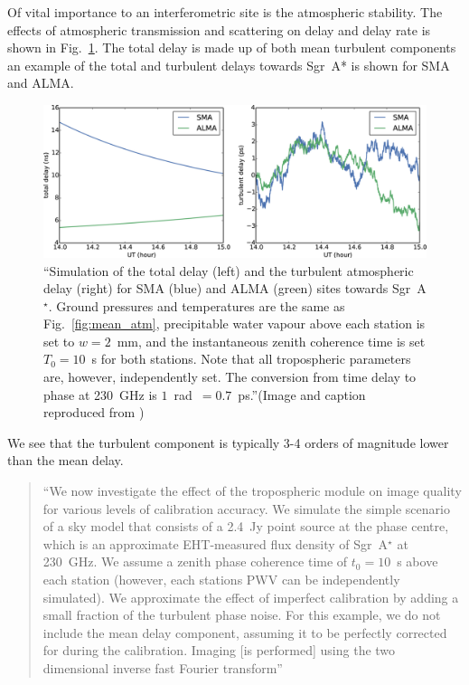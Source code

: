 Of vital importance to an interferometric site is the atmospheric stability. The effects of atmospheric transmission and scattering on delay and delay rate is shown in Fig.~\ref{delay_plots}. The total delay is made up of both mean turbulent components an example of the total and turbulent delays towards Sgr~A* is shown for SMA and ALMA. 


\begin{figure}[h!]
\includegraphics[width=\columnwidth]{Images/delays}
\caption{``Simulation of the total delay (left) and the turbulent atmospheric delay (right) for SMA (blue) and ALMA (green) sites towards Sgr~A$^\star$. Ground pressures and temperatures are the same as Fig.~\ref{fig:mean_atm}, precipitable water vapour above each station is set to $w=2$~mm, and the instantaneous zenith coherence time is set $T_0=10$~s for both stations. Note that all tropospheric parameters are, however, independently set. The conversion from time delay to phase at 230~GHz is $1$~rad~$=0.7$~ps.''(Image and caption reproduced from \citet{Blecher_2016})\label{delay_plots}%
}
\end{figure}


We see that the turbulent component is typically 3-4 orders of magnitude lower than the mean delay.

\begin{quotation}
``We now investigate the effect of the tropospheric module on image quality for various levels of calibration accuracy. We simulate the simple scenario of a sky model that consists of a 2.4~Jy point source at the phase centre, which is an approximate EHT-measured flux density of Sgr~A$^\star$ at 230~GHz. We assume a zenith phase coherence time of $t_0=10$~s above each station (however, each stations PWV can be independently simulated). We approximate the effect of imperfect calibration by adding a small fraction of the turbulent phase noise. For this example, we do not include the mean delay component, assuming it to be perfectly corrected for during the calibration. Imaging [is performed] using the two dimensional inverse fast Fourier transform''\\
\citep{Blecher_2016}
\end{quotation}

